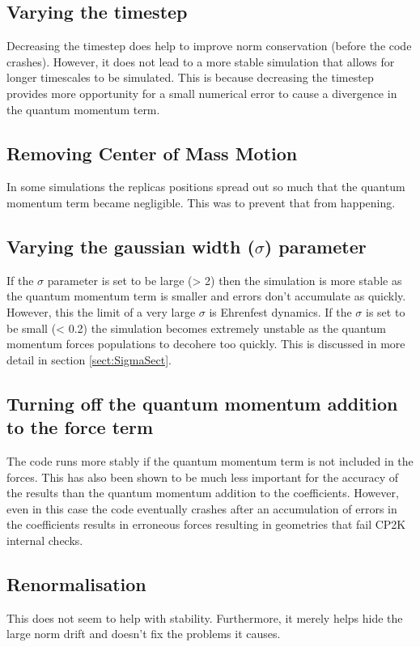 \subsection{Varying the timestep}
Decreasing the timestep does help to improve norm conservation (before the code crashes). However, it does not lead to a more stable simulation that allows for longer timescales to be simulated. This is because decreasing the timestep provides more opportunity for a small numerical error to cause a divergence in the quantum momentum term.
\\
\subsection{Removing Center of Mass Motion}
In some simulations the replicas positions spread out so much that the quantum momentum term became negligible. This was to prevent that from happening.
\\
\subsection{Varying the gaussian width ($\sigma$) parameter}
If the $\sigma$ parameter is set to be large (> 2) then the simulation is more stable as the quantum momentum term is smaller and errors don't accumulate as quickly. However, this the limit of a very large $\sigma$ is Ehrenfest dynamics. If the $\sigma$ is set to be small (< 0.2) the simulation becomes extremely unstable as the quantum momentum forces populations to decohere too quickly. This is discussed in more detail in section \ref{sect:SigmaSect}.
\\
\subsection{Turning off the quantum momentum addition to the force term}
The code runs more stably if the quantum momentum term is not included in the forces. This has also been shown to be much less important for the accuracy of the results than the quantum momentum addition to the coefficients. However, even in this case the code eventually crashes after an accumulation of errors in the coefficients results in erroneous forces resulting in geometries that fail CP2K internal checks.
\\
\subsection{Renormalisation}
This does not seem to help with stability. Furthermore, it merely helps hide the large norm drift and doesn't fix the problems it causes.




